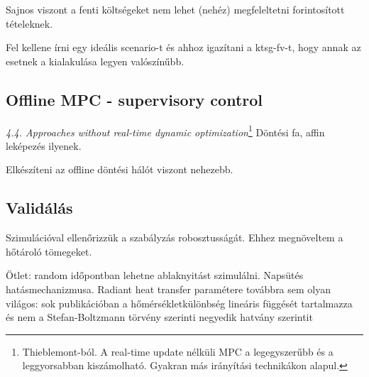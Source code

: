 Sajnos viszont a fenti költségeket nem lehet (nehéz) megfeleltetni forintosított tételeknek.

Fel kellene írni egy ideális scenario-t és ahhoz igazítani a ktsg-fv-t, hogy annak az esetnek a kialakulása legyen valószínűbb.

\hrulefill

\subsection{Offline MPC - supervisory control}

\textit{4.4. Approaches without real-time dynamic optimization}\footnote{Thieblemont-ból. A real-time update nélküli MPC a legegyszerűbb és a leggyorsabban kiszámolható. Gyakran más irányítási technikákon alapul.} Döntési fa, affin leképezés ilyenek.

Elkészíteni az offline döntési hálót viszont nehezebb.


	


\subsection{Validálás}
Szimulációval ellenőrizzük a szabályzás robosztusságát. Ehhez megnöveltem a hőtároló tömegeket.

Ötlet: random időpontban lehetne ablaknyitást szimulálni.
Napsütés hatásmechanizmusa.
Radiant heat transfer paramétere továbbra sem olyan világos: sok publikációban a hőmérsékletkülönbség lineáris függését tartalmazza és nem a Stefan-Boltzmann törvény szerinti negyedik hatvány szerintit